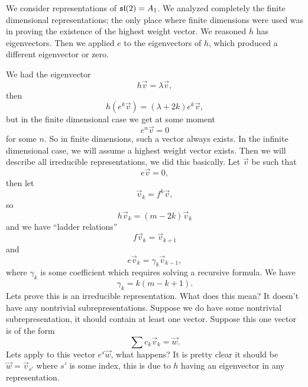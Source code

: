 
We consider representations of $\frak{sl}(2)=A_{1}$. We analyzed
completely the finite dimensional representations; the only place
where finite dimensions were used was in proving the existence of
the highest weight vector. We reasoned $h$ has eigenvectors. Then
we applied $e$ to the eigenvectors of $h$, which produced a
different eigenvector or zero.

We had the eigenvector
\begin{equation}
h\vec{v}=\lambda\vec{v},
\end{equation}
then
\begin{equation}
h(e^{k}\vec{v})=(\lambda+2k)e^{k}\vec{v},
\end{equation}
but in the finite dimensional case we get at some moment
\begin{equation}
e^{n}\vec{v}=0
\end{equation}
for some $n$. So in finite dimensions, such a vector always
exists. In the infinite dimensional case, we will assume a
highest weight vector exists. Then we will describe all
irreducible representations, we did this basically. Let $\vec{v}$
be such that
\begin{equation}
e\vec{v}=0,
\end{equation}
then let
\begin{equation}
\vec{v}_{k}=f^{k}\vec{v},
\end{equation}
so
\begin{equation}
h\vec{v}_{k}=(m-2k)\vec{v}_{k}
\end{equation}
and we have ``ladder relations''
\begin{equation}
f\vec{v}_{k}=\vec{v}_{k+1}
\end{equation}
and
\begin{equation}
e\vec{v}_{k}=\gamma_{k}\vec{v}_{k-1},
\end{equation}
where $\gamma_{k}$ is some coefficient which requires solving a
recursive formula. We have
\begin{equation}
\gamma_{k}=k(m-k+1).
\end{equation}
Lets prove this is an irreducible representation. What does this
mean? It doesn't have any nontrivial subrepresentations. Suppose
we do have some nontrivial subrepresentation, it should contain
at least one vector. Suppose this one vector is of the form
\begin{equation}
\sum c_{k}\vec{v}_{k}=\vec{w}.
\end{equation}
Lets apply to this vector $e^{s}\vec{w}$, what happens? It is pretty
clear it should be $\vec{w}=\vec{v}_{s'}$ where $s'$ is some
index, this is due to $h$ having an eigenvector in any representation.

